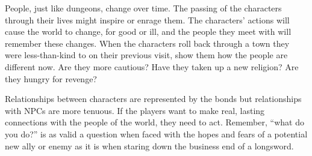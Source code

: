  People, just like dungeons, change over time. The passing of the characters through their lives might inspire or enrage them. The characters' actions will cause the world to change, for good or ill, and the people they meet with will remember these changes. When the characters roll back through a town they were less-than-kind to on their previous visit, show them how the people are different now. Are they more cautious? Have they taken up a new religion? Are they hungry for revenge?


 Relationships between characters are represented by the bonds but relationships with NPCs are more tenuous. If the players want to make real, lasting connections with the people of the world, they need to act. Remember, ``what do you do?'' is as valid a question when faced with the hopes and fears of a potential new ally or enemy as it is when staring down the business end of a longsword.


